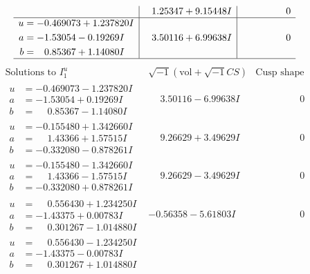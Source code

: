 \documentclass[1p]{elsarticle_modified}
\theoremstyle{definition}
\newcommand{\I}{\sqrt{-1}}
\begin{document}
$$\begin{array}{c|c|c}
 & \phantom{-}1.25347 + 9.15448 I & \phantom{-0.000000 } 0 \\ \hline\begin{aligned}
u &= -0.469073 + 1.237820 I \\
a &= -1.53054 - 0.19269 I \\
b &= \phantom{-}0.85367 + 1.14080 I\end{aligned}
 & \phantom{-}3.50116 + 6.99638 I & \phantom{-0.000000 } 0\\
 \hline 
 \end{array}$$\newpage$$\begin{array}{c|c|c}  
\text{Solutions to }I^u_{1}& \I (\text{vol} + \sqrt{-1}CS) & \text{Cusp shape}\\
 \hline 
\begin{aligned}
u &= -0.469073 - 1.237820 I \\
a &= -1.53054 + 0.19269 I \\
b &= \phantom{-}0.85367 - 1.14080 I\end{aligned}
 & \phantom{-}3.50116 - 6.99638 I & \phantom{-0.000000 } 0 \\ \hline\begin{aligned}
u &= -0.155480 + 1.342660 I \\
a &= \phantom{-}1.43366 + 1.57515 I \\
b &= -0.332080 - 0.878261 I\end{aligned}
 & \phantom{-}9.26629 + 3.49629 I & \phantom{-0.000000 } 0 \\ \hline\begin{aligned}
u &= -0.155480 - 1.342660 I \\
a &= \phantom{-}1.43366 - 1.57515 I \\
b &= -0.332080 + 0.878261 I\end{aligned}
 & \phantom{-}9.26629 - 3.49629 I & \phantom{-0.000000 } 0 \\ \hline\begin{aligned}
u &= \phantom{-}0.556430 + 1.234250 I \\
a &= -1.43375 + 0.00783 I \\
b &= \phantom{-}0.301267 - 1.014880 I\end{aligned}
 & -0.56358 - 5.61803 I & \phantom{-0.000000 } 0 \\ \hline\begin{aligned}
u &= \phantom{-}0.556430 - 1.234250 I \\
a &= -1.43375 - 0.00783 I \\
b &= \phantom{-}0.301267 + 1.014880 I\end{aligned}

\end{array}$$
\end{document}
